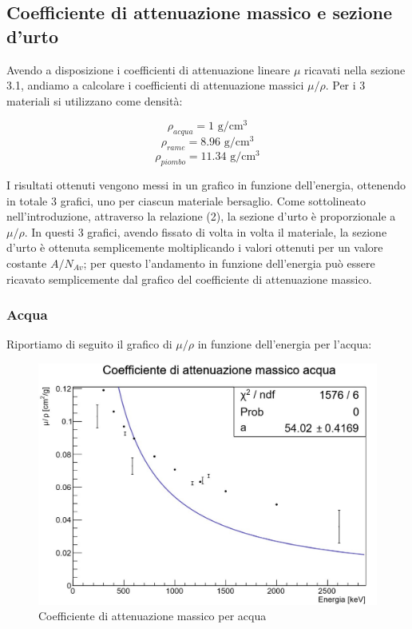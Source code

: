 \documentclass[a4paper,10pt]{article}
\newcommand*{\unit}[1]{\ensuremath{\mathrm{\,#1}}}
\begin{document}
\subsection{Coefficiente di attenuazione massico e sezione d'urto}
Avendo a disposizione i coefficienti di attenuazione lineare $\mu$ ricavati nella sezione 3.1, andiamo a calcolare i coefficienti di attenuazione massici $\mu/\rho$. Per i 3 materiali si utilizzano come densit\`a:

$$
	\rho_{acqua} = 1\, \unit{g/cm^3}
$$
$$
	\rho_{rame} = 8.96\, \unit{g/cm^3}
$$
$$
	\rho_{piombo} = 11.34\, \unit{g/cm^3}
$$

\noindent I risultati ottenuti vengono messi in un grafico in funzione dell'energia, ottenendo in totale 3 grafici, uno per ciascun materiale bersaglio. Come sottolineato nell'introduzione, attraverso la relazione (2), la sezione d'urto \`e proporzionale a $\mu/\rho$. In questi 3 grafici, avendo fissato di volta in volta il materiale, la sezione d'urto \`e ottenuta semplicemente moltiplicando i valori ottenuti per un valore costante $A/N_{Av}$; per questo l'andamento in funzione dell'energia pu\`o essere ricavato semplicemente dal grafico del coefficiente di attenuazione massico.

\subsubsection{Acqua}
Riportiamo di seguito il grafico di $\mu/\rho$ in funzione dell'energia per l'acqua:

\begin{figure}[H]
    \centering
    \includegraphics[scale=0.6]{grafici/massicoacqua}
    \caption{Coefficiente di attenuazione massico per acqua}
\end{figure}
\end{document}

